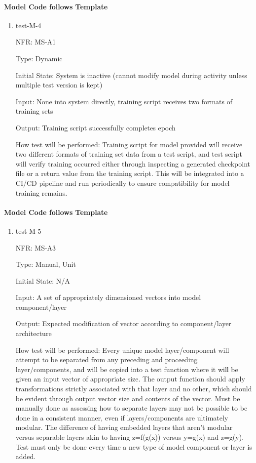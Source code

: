 \documentclass[12pt, titlepage]{article}
\begin{document}
\paragraph{Model Code follows Template }

\begin{enumerate}
  \item{test-M-4}

  NFR: MS-A1

  Type: Dynamic 

  Initial State: System is inactive
  (cannot modify model during activity unless 
  multiple test version is kept)

  Input: None into system directly, training script receives two formats of training sets

  Output: Training script successfully completes epoch 

  How test will be performed:
  Training script for model provided will
receive two different formats of training set data from a test script, and 
test script will verify training occurred either through inspecting a generated
checkpoint file or a return value from the training script. This will be integrated into a CI/CD pipeline 
and run periodically to ensure compatibility for model training remains.
\end{enumerate}

\paragraph{Model Code follows Template }
\begin{enumerate}
  \item{test-M-5}

  NFR: MS-A3

  Type: Manual, Unit

  Initial State: N/A

  Input: A set of appropriately dimensioned vectors into model component/layer

  Output: Expected modification of vector according to component/layer architecture

  How test will be performed:
  Every unique model layer/component will attempt to be separated from any preceding and proceeding layer/components, and will be
copied into a test function where it will be given an input vector of appropriate size. The output function should apply transformations strictly associated with that layer and no other, which should be evident through output vector size and
contents of the vector. Must be manually done as assessing how to separate layers may not be possible to be done in a consistent manner, even if layers/components are ultimately modular. The difference of having embedded layers that aren't modular versus 
separable layers akin to having z=f(g(x)) versus y=g(x) and z=g(y). Test must only be done every time a new type of model component or 
layer is added.
\end{enumerate}
\end{document}
